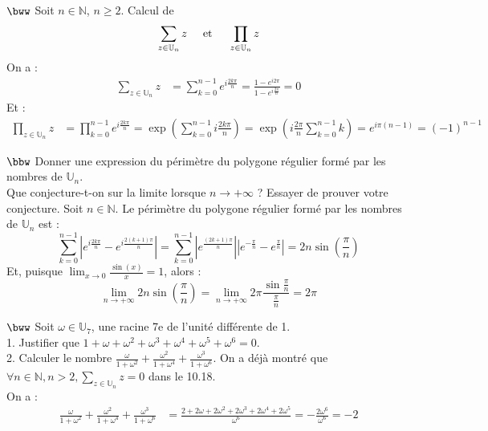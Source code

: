 \documentclass[11pt]{article}
\begin{document}
\begin{exercice}{$\bww$}{}
    Soit $n\in\mathbb{N}$, $n\geq2$. Calcul de
    \begin{equation*}
        \sum_{z\in\mathbb{U}_n}{z} \hspace{0.5cm} \text{et} \hspace{0.5cm} \prod_{z\in\mathbb{U}_n}z
    \end{equation*}
    \tcblower
    On a :
    \begin{align*}
        \sum_{z\in\mathbb{U}_n}{z}&=\sum_{k=0}^{n-1}{e^{i\frac{2k\pi}{n}}}=\frac{1-e^{i2\pi}}{1-e^{i\frac{2\pi}{n}}}=0
    \end{align*}
    Et :
    \begin{align*}
        \prod_{z\in\mathbb{U}_n}{z}&=\prod_{k=0}^{n-1}{e^{i\frac{2k\pi}{n}}}=\exp\left( \sum_{k=0}^{n-1}{i\frac{2k\pi}{n}} \right) = \exp\left( i\frac{2\pi}{n}\sum_{k=0}^{n-1}{k} \right)=e^{i\pi(n-1)}=(-1)^{n-1}
    \end{align*}
\end{exercice}

\begin{exercice}{$\bbw$}{}
    Donner une expression du périmètre du polygone régulier formé par les nombres de $\mathbb{U}_n$.\\
    Que conjecture-t-on sur la limite lorsque $n\to+\infty$ ? Essayer de prouver votre conjecture.
    \tcblower
    Soit $n\in\mathbb{N}$. Le périmètre du polygone régulier formé par les nombres de $\mathbb{U}_n$ est :
    \begin{equation*}
        \sum_{k=0}^{n-1}{|e^{i\frac{2k\pi}{n}} - e^{i\frac{2(k+1)\pi}{n}}|}=\sum_{k=0}^{n-1}{|e^{\frac{(2k+1)\pi}{n}}||e^{-\frac{\pi}{n}} - e^{\frac{\pi}{n}}|}=2n\sin\left( \frac{\pi}{n} \right)
    \end{equation*}
    Et, puisque $\lim_{x\to0}{\frac{\sin(x)}{x}}=1$, alors :
    \begin{equation*}
        \lim_{n\to+\infty}{2n\sin\left(\frac{\pi}{n}\right)}=\lim_{n\to+\infty}2\pi\frac{\sin\frac{\pi}{n}}{\frac{\pi}{n}}=2\pi
    \end{equation*}
\end{exercice}

\begin{exercice}{$\bww$}{}
    Soit $\omega\in\mathbb{U}_7$, une racine 7e de l'unité différente de 1.\\
    1. Justifier que $1+\omega+\omega^2+\omega^3+\omega^4+\omega^5+\omega^6=0$.\\
    2. Calculer le nombre $\frac{\omega}{1+\omega^2} + \frac{\omega^2}{1+\omega^4} + \frac{\omega^3}{1+\omega^6}$.
    \tcblower
     On a déjà montré que $\forall{n\in\mathbb{N}},n>2,\sum\limits_{z\in\mathbb{U}_n}z=0$ dans le 10.18.\\
     On a :
    \begin{align*}
        \frac{\omega}{1+\omega^2} + \frac{\omega^2}{1+\omega^4} + \frac{\omega^3}{1+\omega^6} &=
        \frac{2+2\omega+2\omega^2+2\omega^3+2\omega^4+2\omega^5}{\omega^6}=-\frac{2\omega^6}{\omega^6}=-2
    \end{align*}
\end{exercice}
\end{document}
